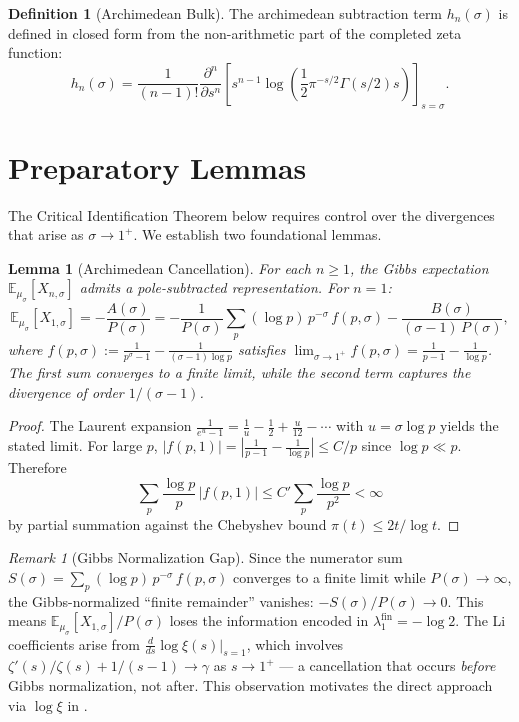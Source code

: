 \documentclass[12pt,a4paper]{article}
\newtheorem{lemma}[theorem]{Lemma}
\theoremstyle{definition}
\newtheorem{definition}[theorem]{Definition}
\theoremstyle{remark}
\newtheorem{remark}[theorem]{Remark}
\begin{document}
\begin{definition}[Archimedean Bulk]
The archimedean subtraction term $h_n(\sigma)$ is defined in closed form from the non-arithmetic part of the completed zeta function:
\[ h_n(\sigma) = \frac{1}{(n-1)!} \frac{\partial^n}{\partial s^n} \left[ s^{n-1} \log \left( \frac{1}{2} \pi^{-s/2} \Gamma(s/2) s \right) \right]_{s=\sigma}. \]
\end{definition}

\section{Preparatory Lemmas}

The Critical Identification Theorem below requires control over the divergences that arise as $\sigma \to 1^+$. We establish two foundational lemmas.

\begin{lemma}[Archimedean Cancellation]\label{lem:arch-cancel}
For each $n \ge 1$, the Gibbs expectation $\mathbb{E}_{\mu_\sigma}[X_{n,\sigma}]$ admits a pole-subtracted representation. For $n=1$:
\[ \mathbb{E}_{\mu_\sigma}[X_{1,\sigma}] = -\frac{A(\sigma)}{P(\sigma)} = -\frac{1}{P(\sigma)} \sum_p (\log p)\, p^{-\sigma}\, f(p,\sigma) - \frac{B(\sigma)}{(\sigma-1)\,P(\sigma)}, \]
where $f(p,\sigma) := \frac{1}{p^\sigma - 1} - \frac{1}{(\sigma-1)\log p}$ satisfies $\lim_{\sigma \to 1^+} f(p,\sigma) = \frac{1}{p-1} - \frac{1}{\log p}$. The first sum converges to a finite limit, while the second term captures the divergence of order $1/(\sigma-1)$.
\end{lemma}
\begin{proof}
The Laurent expansion $\frac{1}{e^u-1} = \frac{1}{u} - \frac{1}{2} + \frac{u}{12} - \cdots$ with $u = \sigma \log p$ yields the stated limit. For large $p$, $|f(p,1)| = |\frac{1}{p-1} - \frac{1}{\log p}| \le C/p$ since $\log p \ll p$. Therefore
\[ \sum_p \frac{\log p}{p}\,|f(p,1)| \le C' \sum_p \frac{\log p}{p^2} < \infty \]
by partial summation against the Chebyshev bound $\pi(t) \le 2t/\log t$.
\end{proof}

\begin{remark}[Gibbs Normalization Gap]\label{rem:gibbs-gap}
Since the numerator sum $S(\sigma) = \sum_p (\log p)\,p^{-\sigma}\,f(p,\sigma)$ converges to a finite limit while $P(\sigma) \to \infty$, the Gibbs-normalized ``finite remainder'' vanishes: $-S(\sigma)/P(\sigma) \to 0$. This means $\mathbb{E}_{\mu_\sigma}[X_{1,\sigma}]/P(\sigma)$ loses the information encoded in $\lambda_1^{\mathrm{fin}} = -\log 2$. The Li coefficients arise from $\frac{d}{ds}\log\xi(s)\big|_{s=1}$, which involves $\zeta'(s)/\zeta(s) + 1/(s-1) \to \gamma$ as $s \to 1^+$ --- a cancellation that occurs \emph{before} Gibbs normalization, not after. This observation motivates the direct approach via $\log\xi$ in .
\end{remark}
\end{document}
